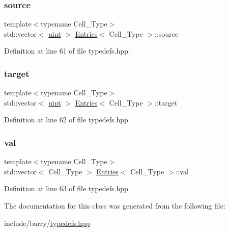 \subsubsection{\texorpdfstring{source}{source}}
{\footnotesize\ttfamily template$<$typename Cell\+\_\+\+Type$>$ \\
std\+::vector$<$ \hyperlink{typedefs_8hpp_a91ad9478d81a7aaf2593e8d9c3d06a14}{uint} $>$ \hyperlink{class_entries}{Entries}$<$ Cell\+\_\+\+Type $>$\+::source}



Definition at line 61 of file typedefs.\+hpp.

\mbox{\label{class_entries_a02dad3917fa68044b9ea9c60b2909fd7}} 
\subsubsection{\texorpdfstring{target}{target}}
{\footnotesize\ttfamily template$<$typename Cell\+\_\+\+Type$>$ \\
std\+::vector$<$ \hyperlink{typedefs_8hpp_a91ad9478d81a7aaf2593e8d9c3d06a14}{uint} $>$ \hyperlink{class_entries}{Entries}$<$ Cell\+\_\+\+Type $>$\+::target}



Definition at line 62 of file typedefs.\+hpp.

\mbox{\label{class_entries_ae0726e20b17868665cdae6ff70f93bb4}} 
\subsubsection{\texorpdfstring{val}{val}}
{\footnotesize\ttfamily template$<$typename Cell\+\_\+\+Type$>$ \\
std\+::vector$<$ Cell\+\_\+\+Type $>$ \hyperlink{class_entries}{Entries}$<$ Cell\+\_\+\+Type $>$\+::val}



Definition at line 63 of file typedefs.\+hpp.



The documentation for this class was generated from the following file\+:\begin{DoxyCompactItemize}
\item 
include/barry/\hyperlink{typedefs_8hpp}{typedefs.\+hpp}\end{DoxyCompactItemize}

